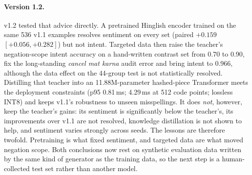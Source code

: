 \documentclass[11pt,a4paper]{article}
\theoremstyle{remark}
\newcommand{\hi}[1]{\textit{#1}}                       %
\begin{document}
\paragraph{Version 1.2.} v1.2 tested that advice directly. A pretrained
Hinglish encoder trained on the same 536 v1.1 examples resolves sentiment on
every set (paired $+0.159$ $[+0.056, +0.282]$) but not intent. Targeted data
then raise the teacher's negation-scope intent accuracy on a hand-written
contrast set from 0.70 to 0.90, fix the long-standing \hi{cancel mat karna}
audit error and bring intent to 0.966, although the data effect on the 44-group
test is not statistically resolved. Distilling that teacher into an
11.88M-parameter hashed-piece Transformer meets the deployment constraints
(p95 0.81\,ms; 4.29\,ms at 512 code points; lossless INT8) and keeps v1.1's
robustness to unseen misspellings. It does \emph{not}, however, keep the
teacher's gains: its sentiment is significantly below the teacher's, its
improvements over v1.1 are not resolved, knowledge distillation is not shown
to help, and sentiment varies strongly across seeds. The lessons are
therefore twofold. Pretraining is what fixed sentiment, and targeted data are
what moved negation scope. Both conclusions now rest on synthetic evaluation
data written by the same kind of generator as the training data, so the next
step is a human-collected test set rather than another model.

\appendix
\end{document}
